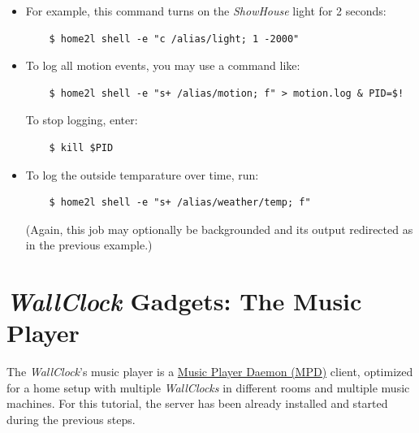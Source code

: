 \documentclass[12pt,english,parskip=half]{scrreprt}
\begin{document}
\begin{itemize}[$\blacktriangleright$]
\item
  For example, this command turns on the \emph{ShowHouse} light for 2 seconds:
  \begin{lstlisting}
    $ home2l shell -e "c /alias/light; 1 -2000"
  \end{lstlisting}

\item
  To log all motion events, you may use a command like:
  \begin{lstlisting}
    $ home2l shell -e "s+ /alias/motion; f" > motion.log & PID=$!
  \end{lstlisting}
  To stop logging, enter:
  \begin{lstlisting}
    $ kill $PID
  \end{lstlisting}

\item
  To log the outside temparature over time, run:
  \begin{lstlisting}
    $ home2l shell -e "s+ /alias/weather/temp; f"
  \end{lstlisting}
  (Again, this job may optionally be backgrounded and its output
  redirected as in the previous example.)

\end{itemize}





\section{\emph{WallClock} Gadgets: The Music Player}
\label{sec:tutorial-wallclock}


The \emph{WallClock}'s music player is a
\href{https://www.musicpd.org/}{Music Player Daemon (MPD)} client,
optimized for a home setup with multiple \emph{WallClocks} in different
rooms and multiple music machines. For this tutorial, the server has been already
installed and started during the previous steps.
\end{document}
